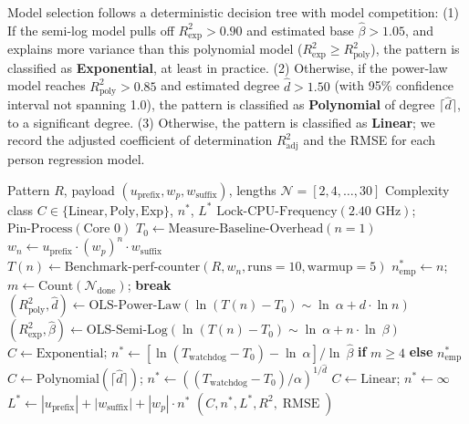 \documentclass{ieeeaccess}
\begin{document}
Model selection follows a deterministic decision tree with model competition: (1) If the semi-log model pulls off $R^2_{\mathrm{exp}} > 0.90$ and estimated base $\hat{\beta} > 1.05$, and explains more variance than this polynomial model ($R^2_{\mathrm{exp}} \ge R^2_{\mathrm{poly}}$), the pattern is classified as \textbf{Exponential}, at least in practice. (2) Otherwise, if the power-law model reaches $R^2_{\mathrm{poly}} > 0.85$ and estimated degree $\hat{d} > 1.50$ (with 95\% confidence interval not spanning 1.0), the pattern is classified as \textbf{Polynomial} of degree $\lceil \hat{d} \rceil$, to a significant degree. (3) Otherwise, the pattern is classified as \textbf{Linear}; we record the adjusted coefficient of determination $R^2_{\mathrm{adj}}$ and the RMSE for each person regression model.

\begin{algorithm}[t]
\caption{Adaptive Telemetry Profiling \& OLS Model Competition}
\label{algo:telemetry_ols}
\begin{algorithmic}[1]
\REQUIRE Pattern $R$, payload $(u_{\mathrm{prefix}}, w_p, w_{\mathrm{suffix}})$, lengths $\mathcal{N} = [2, 4, \dots, 30]$
\ENSURE Complexity class $C \in \{\text{Linear}, \text{Poly}, \text{Exp}\}$, $n^*$, $L^*$
\STATE $\text{Lock-CPU-Frequency}(2.40\text{ GHz})$; $\text{Pin-Process}(\text{Core 0})$
\STATE $T_0 \leftarrow \text{Measure-Baseline-Overhead}(n = 1)$
    \STATE $w_n \leftarrow u_{\mathrm{prefix}} \cdot (w_p)^n \cdot w_{\mathrm{suffix}}$
    \STATE $T(n) \leftarrow \text{Benchmark-perf-counter}(R, w_n, \text{runs}=10, \text{warmup}=5)$
        \STATE $n^*_{\mathrm{emp}} \leftarrow n$; $m \leftarrow \text{Count}(\mathcal{N}_{\mathrm{done}})$; \textbf{break}
    \ENDIF
\ENDFOR
\STATE $(R^2_{\mathrm{poly}}, \hat{d}) \leftarrow \text{OLS-Power-Law}(\ln(T(n) - T_0) \sim \ln\ \alpha + d \cdot \ln n)$
\STATE $(R^2_{\mathrm{exp}}, \hat{\beta}) \leftarrow \text{OLS-Semi-Log}(\ln(T(n) - T_0) \sim \ln\ \alpha + n \cdot \ln\ \beta)$
    \STATE $C \leftarrow \text{Exponential}$; $n^* \leftarrow [\ln(T_{\mathrm{watchdog}} - T_0) - \ln\ \alpha] / \ln\ \hat{\beta}$ \textbf{if} $m \ge 4$ \textbf{else} $n^*_{\mathrm{emp}}$
    \STATE $C \leftarrow \text{Polynomial}(\lceil \hat{d} \rceil)$; $n^* \leftarrow ((T_{\mathrm{watchdog}} - T_0)/\alpha)^{1/\hat{d}}$
\ELSE
    \STATE $C \leftarrow \text{Linear}$; $n^* \leftarrow \infty$
\ENDIF
\STATE $L^* \leftarrow |u_{\mathrm{prefix}}| + |w_{\mathrm{suffix}}| + |w_p| \cdot n^*$
\RETURN $(C, n^*, L^*, R^2, \operatorname{RMSE})$
\end{algorithmic}
\end{algorithm}
\end{document}
